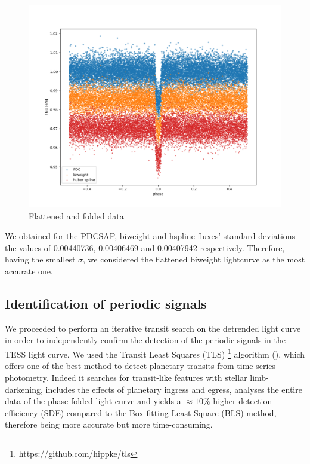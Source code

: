\documentclass[a4paper,11pt,twocolumn]{article}
\begin{document}
\begin{figure}
    \includegraphics[scale=0.18, angle=0]{../pictures/tess/phase.png}
    \caption{Flattened and folded data}
   \label{fig:Transits}
\end{figure}


We obtained for the PDCSAP, biweight and hspline fluxes' standard deviations the values of 0.00440736, 0.00406469 and 
0.00407942 respectively. Therefore, having the smallest $\sigma$, we considered the flattened biweight lightcurve as the most accurate one.

\subsection{Identification of periodic signals}

We proceeded to perform an iterative  transit search on the detrended light curve in order to independently 
confirm the detection of the periodic signals in the TESS light curve.
We used  the Transit Least Squares (TLS) \footnote{https://github.com/hippke/tls} algorithm (\cite{Hippke2}), 
which offers one of the best method to detect planetary transits from time-series photometry.
Indeed it searches for transit-like features with stellar limb-darkening, includes the effects of planetary 
ingress and egress, analyses the entire data of the phase-folded light curve and yields a $\approx 10 \% $ higher 
detection efficiency (SDE) compared to the Box-fitting Least Square (BLS) method, therefore being more accurate but more time-consuming. 
\end{document}
